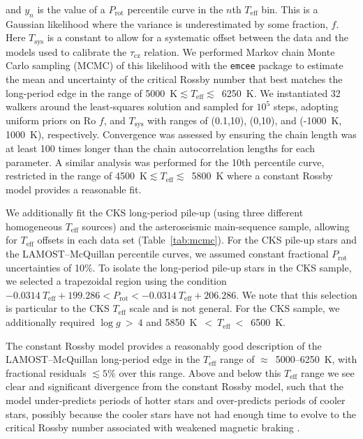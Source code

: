 \documentclass[linenumbers,tighten,trackchanges,twocolumn]{aastex631}
\newcommand{\taucz}{$\tau_\mathrm{cz}$\xspace}
\newcommand{\lamostmcq}{LAMOST--McQuillan\xspace}
\newcommand{\teff}{\ensuremath{T_{\mathrm{eff}}}\xspace}
\newcommand{\logg}{\ensuremath{\log g}\xspace}
\newcommand{\prot}{\ensuremath{P_\mathrm{rot}}\xspace}
\begin{document}
and $y_n$ is the value of a \prot percentile curve in the $n$th \teff bin. This is a Gaussian likelihood where the variance is underestimated by some fraction, $f$. Here $T_\mathrm{sys}$ is a constant to allow for a systematic offset between the data and the models used to calibrate the \taucz relation. We performed Markov chain Monte Carlo sampling (MCMC) of this likelihood with the \texttt{emcee} package \citep{emcee2013, emcee2019} to estimate the mean and uncertainty of the critical Rossby number that best matches the long-period edge in the range of 5000~K$\lesssim \teff \lesssim$~6250~K. We instantiated 32 walkers around the least-squares solution and sampled for $10^5$ steps, adopting uniform priors on Ro $f$, and $T_\mathrm{sys}$ with ranges of (0.1,10), (0,10), and (-1000~K, 1000~K), respectively. Convergence was assessed by ensuring the chain length was at least 100 times longer than the chain autocorrelation lengths for each parameter. A similar analysis was performed for the 10th percentile curve, restricted in the range of 4500~K$\lesssim \teff \lesssim$~5800~K where a constant Rossby model provides a reasonable fit. 

We additionally fit the CKS long-period pile-up (using three different homogeneous \teff sources) and the \citet{Hall2021} asteroseismic main-sequence sample, allowing for \teff offsets in each data set (Table~\ref{tab:mcmc}). {\color{red} For the CKS pile-up stars and the \lamostmcq percentile curves, we assumed constant fractional \prot uncertainties of 10\%.} To isolate the long-period pile-up stars in the CKS sample, we selected a trapezoidal region using the condition $-0.0314~\teff + 199.286 < \prot < -0.0314~\teff + 206.286$. We note that this selection is particular to the CKS \teff scale and is not general. For the CKS sample, we additionally required $\logg~>~4$ and 5850~K~$<~\teff~<$~6500~K. 


The constant Rossby model provides a reasonably good description of the \lamostmcq long-period edge in the \teff range of $\approx$~5000--6250~K, with fractional residuals $\lesssim5\%$ over this range. Above and below this \teff range we see clear and significant divergence from the constant Rossby model, such that the model under-predicts periods of hotter stars and over-predicts periods of cooler stars, possibly because the cooler stars have not had enough time to evolve to the critical Rossby number associated with weakened magnetic braking \citep[see Figure 6 in][]{vanSaders2019}.
\end{document}
